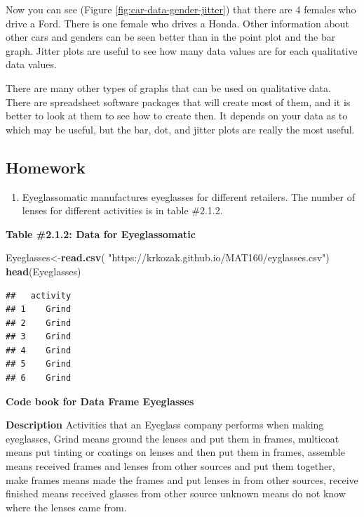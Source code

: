 \documentclass[
]{book}
\newenvironment{Shaded}{\begin{snugshade}}{\end{snugshade}}
\newcommand{\KeywordTok}[1]{\textcolor[rgb]{0.13,0.29,0.53}{\textbf{#1}}}
\newcommand{\NormalTok}[1]{#1}
\newcommand{\StringTok}[1]{\textcolor[rgb]{0.31,0.60,0.02}{#1}}
\providecommand{\tightlist}{%
  \setlength{\itemsep}{0pt}\setlength{\parskip}{0pt}}
\begin{document}
Now you can see (Figure \ref{fig:car-data-gender-jitter}) that there are 4 females who drive a Ford. There is one female who drives a Honda. Other information about other cars and genders can be seen better than in the point plot and the bar graph. Jitter plots are useful to see how many data values are for each qualitative data values.

There are many other types of graphs that can be used on qualitative data. There are spreadsheet software packages that will create most of them, and it is better to look at them to see how to create then. It depends on your data as to which may be useful, but the bar, dot, and jitter plots are really the most useful.

\hypertarget{homework}{%
\subsection{Homework}\label{homework}}

\begin{enumerate}
\def\labelenumi{\arabic{enumi}.}
\tightlist
\item
  Eyeglassomatic manufactures eyeglasses for different retailers. The number of lenses for different activities is in table \#2.1.2.
\end{enumerate}

\textbf{Table \#2.1.2: Data for Eyeglassomatic}

\begin{Shaded}
\begin{Highlighting}[]
\NormalTok{Eyeglasses<-}\KeywordTok{read.csv}\NormalTok{(}
  \StringTok{"https://krkozak.github.io/MAT160/eyglasses.csv"}\NormalTok{)}
\KeywordTok{head}\NormalTok{(Eyeglasses)}
\end{Highlighting}
\end{Shaded}

\begin{verbatim}
##   activity
## 1    Grind
## 2    Grind
## 3    Grind
## 4    Grind
## 5    Grind
## 6    Grind
\end{verbatim}

\textbf{Code book for Data Frame Eyeglasses}

\textbf{Description}
Activities that an Eyeglass company performs when making eyeglasses, Grind means ground the lenses and put them in frames, multicoat means put tinting or coatings on lenses and then put them in frames, assemble means received frames and lenses from other sources and put them together, make frames means made the frames and put lenses in from other sources, receive finished means received glasses from other source unknown means do not know where the lenses came from.
\end{document}
